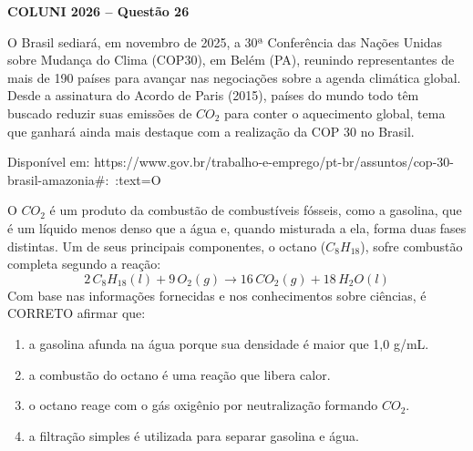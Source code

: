 \textbf{COLUNI 2026 -- Questão 26}\par\medskip O Brasil sediará, em novembro de 2025, a 30ª Conferência das Nações Unidas sobre Mudança do Clima (COP30), em Belém (PA), reunindo representantes de mais de 190 países para avançar nas negociações sobre a agenda climática global. Desde a assinatura do Acordo de Paris (2015), países do mundo todo têm buscado reduzir suas emissões de $CO_2$ para conter o aquecimento global, tema que ganhará ainda mais destaque com a realização da COP 30 no Brasil.\par
Disponível em: https://www.gov.br/trabalho-e-emprego/pt-br/assuntos/cop-30-brasil-amazonia#:~:text=O%

O $CO_2$ é um produto da combustão de combustíveis fósseis, como a gasolina, que é um líquido menos denso que a água e, quando misturada a ela, forma duas fases distintas. Um de seus principais componentes, o octano ($C_8H_{18}$), sofre combustão completa segundo a reação:
\[
2\,C_8H_{18}(l)+9\,O_2(g)\longrightarrow16\,CO_2(g)+18\,H_2O(l)
\]
Com base nas informações fornecidas e nos conhecimentos sobre ciências, é CORRETO afirmar que:\begin{enumerate}
\item a gasolina afunda na água porque sua densidade é maior que 1,0 g/mL.
\item a combustão do octano é uma reação que libera calor.
\item o octano reage com o gás oxigênio por neutralização formando $CO_2$.
\item a filtração simples é utilizada para separar gasolina e água.\end{enumerate}